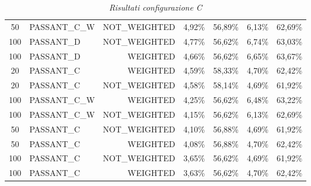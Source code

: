 \begin{table}[H]
{\begin{tabular}{ c l r c c c c }
	50 & PASSANT\_C\_W & NOT\_WEIGHTED &     4,92\% &    56,89\% &     6,13\% &    62,69\% \\
	
	100 &  PASSANT\_D & NOT\_WEIGHTED &     4,77\% &    56,62\% &     6,74\% &    63,03\% \\
	
	100 &  PASSANT\_D &   WEIGHTED &     4,66\% &    56,62\% &     6,65\% &    63,67\% \\
	
	20 &  PASSANT\_C &   WEIGHTED &     4,59\% &    58,33\% &     4,70\% &    62,42\% \\
	
	20 &  PASSANT\_C & NOT\_WEIGHTED &     4,58\% &    58,14\% &     4,69\% &    61,92\% \\
	
	100 & PASSANT\_C\_W &   WEIGHTED &     4,25\% &    56,62\% &     6,48\% &    63,22\% \\
	
	100 & PASSANT\_C\_W & NOT\_WEIGHTED &     4,15\% &    56,62\% &     6,13\% &    62,69\% \\
	
	50 &  PASSANT\_C & NOT\_WEIGHTED &     4,10\% &    56,88\% &     4,69\% &    61,92\% \\
	
	50 &  PASSANT\_C &   WEIGHTED &     4,08\% &    56,88\% &     4,70\% &    62,42\% \\
	
	100 &  PASSANT\_C & NOT\_WEIGHTED &     3,65\% &    56,62\% &     4,69\% &    61,92\% \\
	
	100 &  PASSANT\_C &   WEIGHTED &     3,63\% &    56,62\% &     4,70\% &    62,42\% \\
	\bottomrule
	\end{tabular}  	
}
	\caption{\emph{Risultati configurazione C}}
\end{table}

